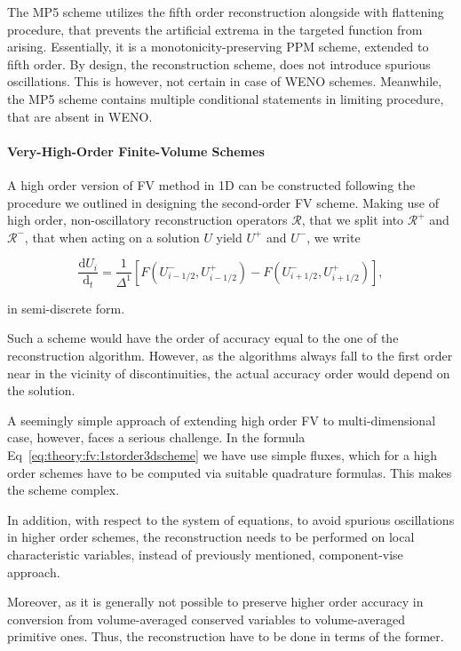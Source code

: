The \ac{MP5} scheme utilizes the fifth order reconstruction alongside with flattening procedure, that prevents the artificial extrema in the targeted function from arising. Essentially, it is a monotonicity-preserving \ac{PPM} scheme, extended to fifth order. 
By design, the reconstruction scheme, does not introduce spurious oscillations. This is however, not certain in case of \ac{WENO} schemes. Meanwhile, the \ac{MP5} scheme contains multiple conditional statements in limiting procedure, that are absent in \ac{WENO}.



\paragraph{Very-High-Order Finite-Volume Schemes}

A high order version of \ac{FV} method in 1D can be constructed following the procedure we outlined in designing the second-order \ac{FV} scheme. Making use of high order, non-oscillatory reconstruction operators $\mathcal{R}$, that we split into $\mathcal{R}^+$ and $\mathcal{R}^-$, that when acting on a solution $U$ yield $U^+$ and $U^-$, we write 

\begin{equation}
\frac{\text{d}U_i}{\text{d}_t} = \frac{1}{\Delta^1}[F(U^{-}_{i-1/2},U^{+}_{i-1/2}) - F(U^{-}_{i+1/2},U^{+}_{i+1/2})],
\end{equation}

in semi-discrete form. 

Such a scheme would have the order of accuracy equal to the one of the reconstruction algorithm. However, as the algorithms always fall to the first order near in the vicinity of discontinuities, the actual accuracy order would depend on the solution. 

A seemingly simple approach of extending high order \ac{FV} to multi-dimensional case, however, faces a serious challenge. In the formula Eq~\eqref{eq:theory:fv:1storder3dscheme} we have use simple fluxes, which for a high order schemes have to be computed via suitable quadrature formulas. This makes the scheme complex. 

In addition, with respect to the system of equations, to avoid spurious oscillations in higher order schemes, the reconstruction needs to be performed on local characteristic variables, instead of previously mentioned, component-vise approach. 

Moreover, as it is generally not possible to preserve higher order accuracy in conversion from volume-averaged conserved variables to volume-averaged primitive ones. Thus, the reconstruction have to be done in terms of the former. 

